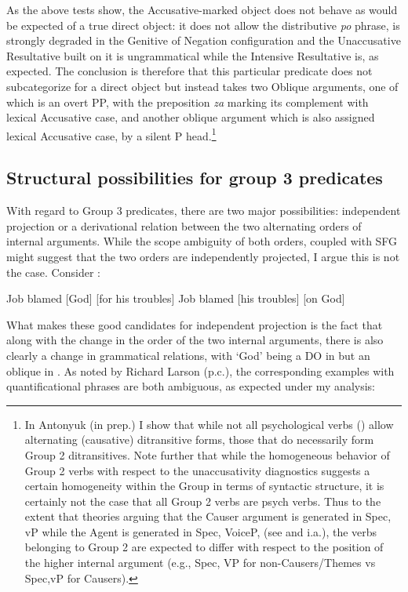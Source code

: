 \documentclass[output=paper,colorlinks,citecolor=brown,nonflat]{./langscibook}
\begin{document}
As the above tests show, the Accusative-marked object does not behave as would be expected of a true direct object: it does not allow the distributive \textit{po} phrase, is strongly degraded in the Genitive of Negation configuration and the Unaccusative Resultative built on it is ungrammatical while the Intensive Resultative is, as expected. The conclusion is therefore that this particular predicate does not subcategorize for a direct object but instead takes two Oblique arguments, one of which is an overt PP, with the preposition \textit{za} marking its complement with lexical Accusative case, and another oblique argument which is also assigned lexical Accusative case, by a silent P head.\footnote{In Antonyuk (in prep.) I show that while not all psychological verbs (\citealt{BellettiRizzi1988}) allow alternating (causative) ditransitive forms, those that do necessarily form Group 2 ditransitives. Note further that while the homogeneous behavior of Group 2 verbs with respect to the unaccusativity diagnostics suggests a certain homogeneity within the Group in terms of syntactic structure, it is certainly not the case that all Group 2 verbs are psych verbs. Thus to the extent that theories arguing that the Causer argument is generated in Spec, vP while the Agent is generated in Spec, VoiceP, (see \citealt{Kratzer2005} and \citealt{AlexiadouEtAl2006} i.a.), the verbs belonging to Group 2 are expected to differ with respect to the position of the higher internal argument (e.g., Spec, VP for non-Causers/Themes vs Spec,vP for Causers).}

\subsection{Structural possibilities for group 3 predicates}\label{sec:antonyuk:4.3}

With regard to Group 3 predicates, there are two major possibilities: independent projection or a derivational relation between the two alternating orders of internal arguments. While the scope ambiguity of both orders, coupled with SFG might suggest that the two orders are independently projected, I argue this is not the case. Consider :


\ea%
    \label{ex:antonyuk:56}
    \ea \label{ex:antonyuk:56a}
    Job blamed [God] [for his troubles] \hfill \citep{Larson1990}
    \ex \label{ex:antonyuk:56b}
    Job blamed [his troubles] [on God]
    \z
\z

What makes these good candidates for independent projection is the fact that along with the change in the order of the two internal arguments, there is also clearly a change in grammatical relations, with ‘God’ being a DO in  but an oblique in . As noted by Richard Larson (p.c.), the corresponding examples with quantificational phrases are both ambiguous, as expected under my analysis:
\end{document}
